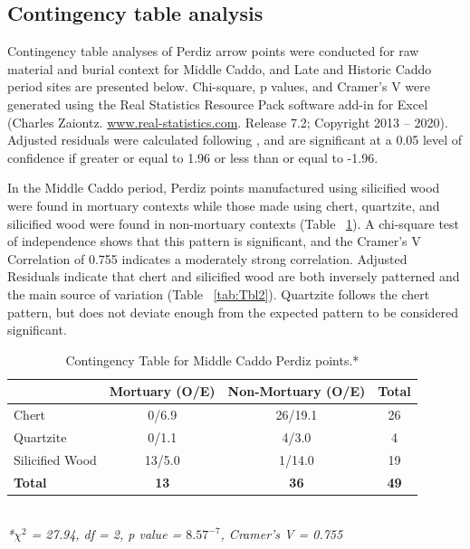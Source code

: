 \documentclass[review]{elsarticle}
\begin{document}
\subsection*{Contingency table analysis}

Contingency table analyses of Perdiz arrow points were conducted for raw material and burial context for Middle Caddo, and Late and Historic Caddo period sites are presented below. Chi-square, p values, and Cramer’s V were generated using the Real Statistics Resource Pack software add-in for Excel (Charles Zaiontz. \href{www.real-statistics.com}{www.real-statistics.com}. Release 7.2; Copyright 2013 – 2020). Adjusted residuals were calculated following \citet{RN8987}, and are significant at a 0.05 level of confidence if greater or equal to 1.96 or less than or equal to -1.96. 

In the Middle Caddo period, Perdiz points manufactured using silicified wood were found in mortuary contexts while those made using chert, quartzite, and silicified wood were found in non-mortuary contexts (Table ~\ref{tab:Tbl1}). A chi-square test of independence shows that this pattern is significant, and the Cramer’s V Correlation of 0.755 indicates a moderately strong correlation. Adjusted Residuals indicate that chert and silicified wood are both inversely patterned and the main source of variation (Table ~\ref{tab:Tbl2}). Quartzite follows the chert pattern, but does not deviate enough from the expected pattern to be considered significant.

\begin{table}[tbh]\centering
\footnotesize
\caption{Contingency Table for Middle Caddo Perdiz points.*}
\centering
\begin{tabular}{lccc}
\hline
 & Mortuary (O/E) & Non-Mortuary (O/E) & Total\\
\hline
Chert & 0/6.9 & 26/19.1 & 26\\
Quartzite & 0/1.1 & 4/3.0 & 4\\
Silicified Wood & 13/5.0 & 1/14.0 & 19\\
\hline
\textbf{Total} & \textbf{13} & \textbf{36} & \textbf{49}\\
\hline
\end{tabular}\\
\textit{*$\chi^{2}$ = 27.94, df = 2, p value = $8.57^{-7}$, Cramer’s V = 0.755}
\label{tab:Tbl1}
\end{table}
\end{document}

